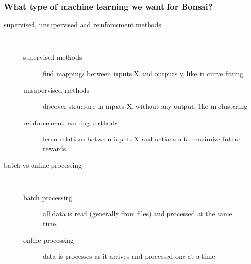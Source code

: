 \begin{frame}
    \frametitle{What type of machine learning we want for Bonsai?}

    \begin{description}

        \item[supervised, unsupervised and reinforcement methods]\mbox{}\\

            \begin{description}

                \item[supervised methods] find mappings between inputs X and outputs y, like in curve fitting

                \item[unsupervised methods] discover structure in inputs X, without any output, like in clustering

                \item[reinforcement learning methods] learn relations between inputs X and actions a to maximize future rewards.

            \end{description}

        \item[batch vs online processing]\mbox{}\\

            \begin{description}

                \item[batch processing] all data is read (generally from files)
                    and processed at the same time.

                \item[online processing] data is processes as it arrives and
                    processed one at a time

            \end{description}

    \end{description}

\end{frame}

